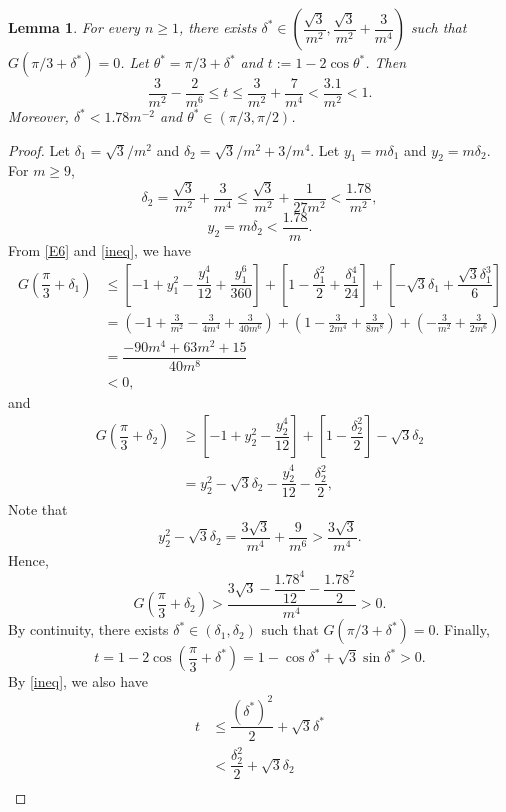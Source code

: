 \documentclass[a4paper,12pt,english,reqno]{amsart}
\newtheorem{lem}[thm]{Lemma}
\theoremstyle{definition}
\theoremstyle{remark}
\begin{document}
\begin{lem}\label{L1}
For every $n\geq 1$, there exists $\delta^{*}\in \left(\dfrac{\sqrt{3}}{m^2},\dfrac{\sqrt{3}}{m^2}+\dfrac{3}{m^4}\right)$
such that $G(\pi/3+\delta^*)=0$. Let $\theta^*=\pi/3+\delta^*$ and $t:=1-2\cos\theta^*$. Then \begin{equation}\label{E8}
\dfrac{3}{m^2}-\dfrac{2}{m^6}\leq t\leq \dfrac{3}{m^2}+\dfrac{7}{m^4}<\dfrac{3.1}{m^2}<1.
\end{equation}
Moreover, $\delta^*<1.78m^{-2}$ and $\theta^*\in (\pi/3,\pi/2)$.
\end{lem}
\begin{proof}
Let $\delta_1=\sqrt{3}/m^2$ and $\delta_2=\sqrt{3}/m^2+3/m^4$. Let $y_1=m\delta_1$ and $y_2=m\delta_2$. For $m\geq 9$, \[\delta_2=\dfrac{\sqrt{3}}{m^2}+\dfrac{3}{m^4}\leq \dfrac{\sqrt{3}}{m^2}+\dfrac{1}{27m^2}<\dfrac{1.78}{m^2},\]
\[y_2=m\delta_2<\dfrac{1.78}{m}.\]
From  \eqref{E6} and \eqref{ineq}, we have 
\[\begin{split}
G\left(\dfrac{\pi}{3}+\delta_1\right)&\leq \left[-1+y_1^2-\dfrac{y_1^4}{12}+\dfrac{y_1^6}{360}\right] +\left[1-\dfrac{\delta_1^2}{2}+\dfrac{\delta_1^4}{24}\right]+\left[-\sqrt{3}\delta_1+\dfrac{\sqrt{3}\delta_1^3}{6}\right]\\
&=\left(
-1+\frac{3}{m^2}-\frac{3}{4m^4}+\frac{3}{40m^6}
\right)+\left(
1-\frac{3}{2m^4}+\frac{3}{8m^8}
\right)+\left(
-\frac{3}{m^2}+\frac{3}{2m^6}
\right)\\
&=\dfrac{-90m^4+63m^2+15}{40m^8}\\
&<0,
\end{split}\]
and
\[\begin{split}
G\left(\dfrac{\pi}{3}+\delta_2\right)&\geq \left[-1+y_2^2-\dfrac{y_2^4}{12}\right]+\left[1-\dfrac{\delta_2^2}{2}\right]-\sqrt{3}\delta_2\\
&=y_2^2-\sqrt{3}\delta_2-\dfrac{y_2^4}{12}-\dfrac{\delta_2^2}{2},
\end{split}\]
Note that \[y_2^2-\sqrt{3}\delta_2=\dfrac{3\sqrt{3}}{m^4}+\dfrac{9}{m^6}>\dfrac{3\sqrt{3}}{m^4}.\]
Hence,
\[G\left(\dfrac{\pi}{3}+\delta_2\right)>\dfrac{3\sqrt{3}-\dfrac{1.78^4}{12}-\dfrac{1.78^2}{2}}{m^4}>0.\]
By continuity, there exists $\delta^*\in (\delta_1,\delta_2)$ such that $G(\pi/3+\delta^*)=0$.
Finally, \[t=1-2\cos(\dfrac{\pi}{3}+\delta^*)=1-\cos\delta^*+\sqrt{3}\sin\delta^*>0.\]
By \eqref{ineq}, we also have
\[\begin{split}t&\leq \dfrac{(\delta^*)^2}{2}+\sqrt{3}\delta^*\\
&<\dfrac{\delta_2^2}{2}+\sqrt{3}\delta_2\\

\end{split}\]
\end{proof}
\end{document}
